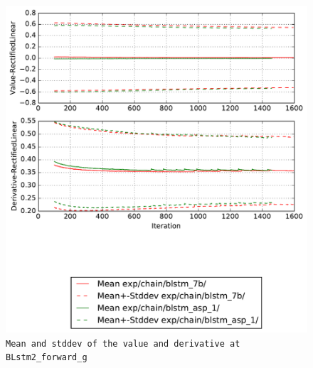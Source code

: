 \documentclass[prl,10pt,twocolumn]{revtex4}
\begin{document}
\newpage
\begin{figure}[h]
  \begin{center}
    \caption{\texttt{Mean and stddev of the value and derivative at BLstm2\_forward\_g}}
    \includegraphics[width=\textwidth]{exp/chain/blstm_7b/report/nonlinstats_BLstm2_forward_g.pdf}
  \end{center}
\end{figure}
\clearpage
\end{document}
